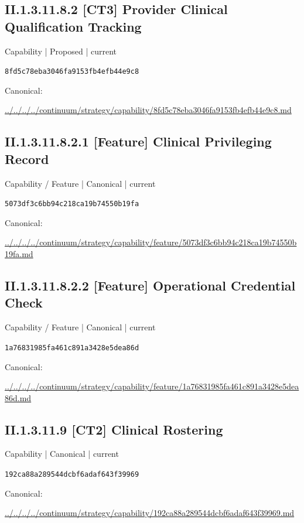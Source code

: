 \documentclass[10pt,a4paper]{article}
\begin{document}
\subsection*{II.1.3.11.8.2 [CT3] Provider Clinical Qualification Tracking}
{\small Capability | Proposed | current}\par
\texttt{8fd5c78eba3046fa9153fb4efb44e9c8}\par
Canonical: \par
{\footnotesize\url{../../../../continuum/strategy/capability/8fd5c78eba3046fa9153fb4efb44e9c8.md}}\par
\subsection*{II.1.3.11.8.2.1 [Feature] Clinical Privileging Record}
{\small Capability / Feature | Canonical | current}\par
\texttt{5073df3c6bb94c218ca19b74550b19fa}\par
Canonical: \par
{\footnotesize\url{../../../../continuum/strategy/capability/feature/5073df3c6bb94c218ca19b74550b19fa.md}}\par
\subsection*{II.1.3.11.8.2.2 [Feature] Operational Credential Check}
{\small Capability / Feature | Canonical | current}\par
\texttt{1a76831985fa461c891a3428e5dea86d}\par
Canonical: \par
{\footnotesize\url{../../../../continuum/strategy/capability/feature/1a76831985fa461c891a3428e5dea86d.md}}\par
\subsection*{II.1.3.11.9 [CT2] Clinical Rostering}
{\small Capability | Canonical | current}\par
\texttt{192ca88a289544dcbf6adaf643f39969}\par
Canonical: \par
{\footnotesize\url{../../../../continuum/strategy/capability/192ca88a289544dcbf6adaf643f39969.md}}\par
\end{document}
